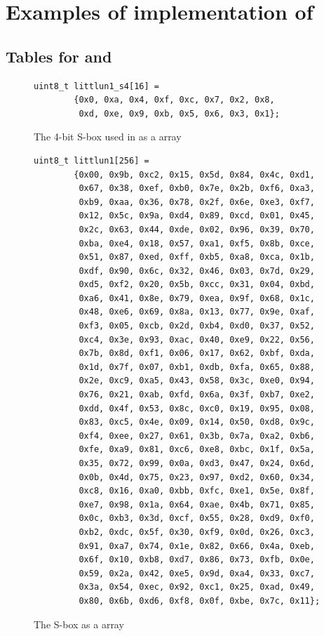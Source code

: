 \section{Examples of implementation of \littlunOne}

\subsection{Tables for \littlunOne and \littlunS}
\label{sec:sbox_tables}

\begin{figure}[ht]
\begin{verbatim}
uint8_t littlun1_s4[16] =
        {0x0, 0xa, 0x4, 0xf, 0xc, 0x7, 0x2, 0x8,
         0xd, 0xe, 0x9, 0xb, 0x5, 0x6, 0x3, 0x1};
\end{verbatim}
\caption{The 4-bit S-box \littlunS used in \littlunOne as a \C array\label{tab4}}
\end{figure}

\begin{figure}[ht]
\begin{verbatim}
uint8_t littlun1[256] =
        {0x00, 0x9b, 0xc2, 0x15, 0x5d, 0x84, 0x4c, 0xd1,
         0x67, 0x38, 0xef, 0xb0, 0x7e, 0x2b, 0xf6, 0xa3,
         0xb9, 0xaa, 0x36, 0x78, 0x2f, 0x6e, 0xe3, 0xf7,
         0x12, 0x5c, 0x9a, 0xd4, 0x89, 0xcd, 0x01, 0x45,
         0x2c, 0x63, 0x44, 0xde, 0x02, 0x96, 0x39, 0x70,
         0xba, 0xe4, 0x18, 0x57, 0xa1, 0xf5, 0x8b, 0xce,
         0x51, 0x87, 0xed, 0xff, 0xb5, 0xa8, 0xca, 0x1b,
         0xdf, 0x90, 0x6c, 0x32, 0x46, 0x03, 0x7d, 0x29,
         0xd5, 0xf2, 0x20, 0x5b, 0xcc, 0x31, 0x04, 0xbd,
         0xa6, 0x41, 0x8e, 0x79, 0xea, 0x9f, 0x68, 0x1c,
         0x48, 0xe6, 0x69, 0x8a, 0x13, 0x77, 0x9e, 0xaf,
         0xf3, 0x05, 0xcb, 0x2d, 0xb4, 0xd0, 0x37, 0x52,
         0xc4, 0x3e, 0x93, 0xac, 0x40, 0xe9, 0x22, 0x56,
         0x7b, 0x8d, 0xf1, 0x06, 0x17, 0x62, 0xbf, 0xda,
         0x1d, 0x7f, 0x07, 0xb1, 0xdb, 0xfa, 0x65, 0x88,
         0x2e, 0xc9, 0xa5, 0x43, 0x58, 0x3c, 0xe0, 0x94,
         0x76, 0x21, 0xab, 0xfd, 0x6a, 0x3f, 0xb7, 0xe2,
         0xdd, 0x4f, 0x53, 0x8c, 0xc0, 0x19, 0x95, 0x08,
         0x83, 0xc5, 0x4e, 0x09, 0x14, 0x50, 0xd8, 0x9c,
         0xf4, 0xee, 0x27, 0x61, 0x3b, 0x7a, 0xa2, 0xb6,
         0xfe, 0xa9, 0x81, 0xc6, 0xe8, 0xbc, 0x1f, 0x5a,
         0x35, 0x72, 0x99, 0x0a, 0xd3, 0x47, 0x24, 0x6d,
         0x0b, 0x4d, 0x75, 0x23, 0x97, 0xd2, 0x60, 0x34,
         0xc8, 0x16, 0xa0, 0xbb, 0xfc, 0xe1, 0x5e, 0x8f,
         0xe7, 0x98, 0x1a, 0x64, 0xae, 0x4b, 0x71, 0x85,
         0x0c, 0xb3, 0x3d, 0xcf, 0x55, 0x28, 0xd9, 0xf0,
         0xb2, 0xdc, 0x5f, 0x30, 0xf9, 0x0d, 0x26, 0xc3,
         0x91, 0xa7, 0x74, 0x1e, 0x82, 0x66, 0x4a, 0xeb,
         0x6f, 0x10, 0xb8, 0xd7, 0x86, 0x73, 0xfb, 0x0e,
         0x59, 0x2a, 0x42, 0xe5, 0x9d, 0xa4, 0x33, 0xc7,
         0x3a, 0x54, 0xec, 0x92, 0xc1, 0x25, 0xad, 0x49,
         0x80, 0x6b, 0xd6, 0xf8, 0x0f, 0xbe, 0x7c, 0x11};
\end{verbatim}
\caption{The \littlunOne S-box as a \C array\label{tab8}}
\end{figure}

